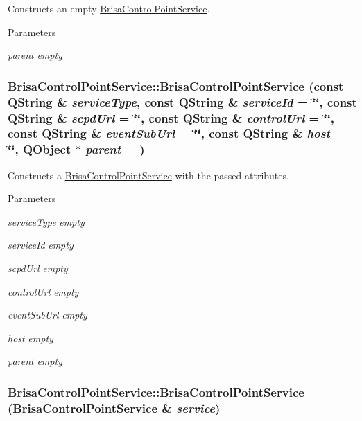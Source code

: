 Constructs an empty \hyperlink{classBrisaUpnp_1_1BrisaControlPointService}{BrisaControlPointService}. 
\begin{DoxyParams}{Parameters}
\item[{\em parent}]{\itshape empty\/} \end{DoxyParams}
\hypertarget{classBrisaUpnp_1_1BrisaControlPointService_a9186e4623236b8780fdc687725d974bb}{
\subsubsection[{BrisaControlPointService}]{\setlength{\rightskip}{0pt plus 5cm}BrisaControlPointService::BrisaControlPointService (const QString \& {\em serviceType}, \/  const QString \& {\em serviceId} = {\ttfamily \char`\"{}\char`\"{}}, \/  const QString \& {\em scpdUrl} = {\ttfamily \char`\"{}\char`\"{}}, \/  const QString \& {\em controlUrl} = {\ttfamily \char`\"{}\char`\"{}}, \/  const QString \& {\em eventSubUrl} = {\ttfamily \char`\"{}\char`\"{}}, \/  const QString \& {\em host} = {\ttfamily \char`\"{}\char`\"{}}, \/  QObject $\ast$ {\em parent} = {})}}
\label{classBrisaUpnp_1_1BrisaControlPointService_a9186e4623236b8780fdc687725d974bb}


Constructs a \hyperlink{classBrisaUpnp_1_1BrisaControlPointService}{BrisaControlPointService} with the passed attributes. 
\begin{DoxyParams}{Parameters}
\item[{\em serviceType}]{\itshape empty\/} \item[{\em serviceId}]{\itshape empty\/} \item[{\em scpdUrl}]{\itshape empty\/} \item[{\em controlUrl}]{\itshape empty\/} \item[{\em eventSubUrl}]{\itshape empty\/} \item[{\em host}]{\itshape empty\/} \item[{\em parent}]{\itshape empty\/} \end{DoxyParams}
\hypertarget{classBrisaUpnp_1_1BrisaControlPointService_a6781dbf8732326e4db39e3e4c1744855}{
\subsubsection[{BrisaControlPointService}]{\setlength{\rightskip}{0pt plus 5cm}BrisaControlPointService::BrisaControlPointService ({\bf BrisaControlPointService} \& {\em service})}}
\label{classBrisaUpnp_1_1BrisaControlPointService_a6781dbf8732326e4db39e3e4c1744855}


